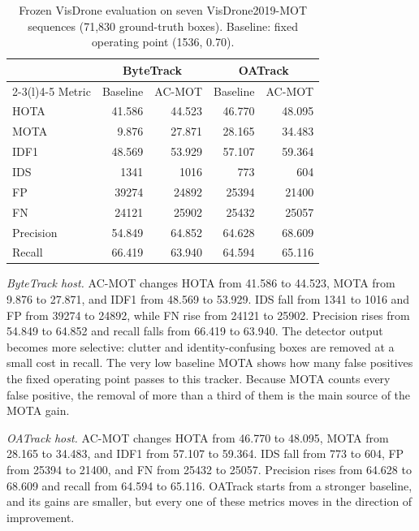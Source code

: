 \documentclass[pdflatex,sn-mathphys-num,iicol]{sn-jnl}
\begin{document}
\begin{table}[t]
\caption{Frozen VisDrone evaluation on seven VisDrone2019-MOT sequences
(71,830 ground-truth boxes). Baseline: fixed operating point (1536, 0.70).}
\label{tab:visdrone}
\centering\footnotesize
\setlength{\tabcolsep}{4pt}
\begin{tabular}{@{}lrrrr@{}}
\toprule
 & \multicolumn{2}{c}{ByteTrack} & \multicolumn{2}{c}{OATrack}\\
\cmidrule(lr){2-3}\cmidrule(l){4-5}
Metric & Baseline & AC-MOT & Baseline & AC-MOT\\
\midrule
HOTA & 41.586 & 44.523 & 46.770 & 48.095\\
MOTA & 9.876 & 27.871 & 28.165 & 34.483\\
IDF1 & 48.569 & 53.929 & 57.107 & 59.364\\
IDS & 1341 & 1016 & 773 & 604\\
FP & 39274 & 24892 & 25394 & 21400\\
FN & 24121 & 25902 & 25432 & 25057\\
Precision & 54.849 & 64.852 & 64.628 & 68.609\\
Recall & 66.419 & 63.940 & 64.594 & 65.116\\
\bottomrule
\end{tabular}
\end{table}

\emph{ByteTrack host.} AC-MOT changes HOTA from 41.586 to 44.523, MOTA from
9.876 to 27.871, and IDF1 from 48.569 to 53.929. IDS fall from 1341 to 1016
and FP from 39274 to 24892, while FN rise from 24121 to 25902. Precision rises
from 54.849 to 64.852 and recall falls from 66.419 to 63.940. The detector
output becomes more selective: clutter and identity-confusing boxes are
removed at a small cost in recall. The very low baseline MOTA shows how many
false positives the fixed operating point passes to this tracker. Because
MOTA counts every false positive, the removal of more than a third of them is
the main source of the MOTA gain.

\emph{OATrack host.} AC-MOT changes HOTA from 46.770 to 48.095, MOTA from
28.165 to 34.483, and IDF1 from 57.107 to 59.364. IDS fall from 773 to 604, FP
from 25394 to 21400, and FN from 25432 to 25057. Precision rises from 64.628 to
68.609 and recall from 64.594 to 65.116. OATrack starts from a stronger
baseline, and its gains are smaller, but every one of these metrics moves in
the direction of improvement.
\end{document}
